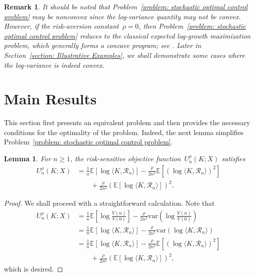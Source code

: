 \documentclass[letterpaper, 10 pt, journal, twoside]{IEEEtran}  %
\newtheorem{lemma}[theorem]{Lemma}
\newtheorem*{remark}{Remark}
\begin{document}
\begin{remark}\rm
    It should be noted that Problem~\eqref{problem: stochastic optimal control problem} may be nonconvex since the log-variance quantity may not be convex. However, if the risk-aversion constant~$\rho =0$, then Problem~\eqref{problem: stochastic optimal control problem} reduces to the classical expected log-growth maximization problem, which generally forms a concave program; see \cite{maclean2011kelly,hsieh2023asymptotic}. Later in Section~\ref{section: Illustrative Examples}, we shall demonstrate some cases where the log-variance is indeed convex.
\end{remark}


\section{Main Results}\label{section: main results}
This section first presents an equivalent problem and then provides the necessary conditions for the optimality of the problem.
 Indeed, the next lemma simplifies Problem~\eqref{problem: stochastic optimal control problem}.

\begin{lemma} \label{lemma: equivalent risk-sensitive problem}
For $n\geq 1$,
    the risk-sensitive objective function~$U_n^\rho(K; X)$   satisfies
    \begin{align*}
	{U_n^\rho}(K; X) 
	&= \frac{1}{n}\mathbb{E}\left[ \log \langle K, \mathcal{R}_n \rangle  \right] - \frac{\rho}{2n^2}\mathbb{E}\left[ \left( \log\langle K, \mathcal{R}_n \rangle  \right)^2 \right] \\
	&\qquad + \frac{\rho}{2n^2}\left( \mathbb{E}\left[ \log\langle K, \mathcal{R}_n \rangle  \right] \right)^2.
\end{align*} 
\end{lemma}

\begin{proof}
We shall proceed with a straightforward calculation.
Note that
    \begin{align*}
	{U_n^\rho}(K; X) 
	&= \frac{1}{n} \mathbb{E}\left[ \log \frac{V(n)}{V(0)} \right] - \frac{\rho}{2n^2}\text{var}\left( \log \frac{V(n)}{V(0)} \right)  \\
	&= \frac{1}{n}\mathbb{E}\left[ \log \langle K, \mathcal{R}_n \rangle \right] - \frac{\rho}{2n^2}\text{var}\left( \log \langle K, \mathcal{R}_n \rangle \right) \\
	&= \frac{1}{n}\mathbb{E}\left[ \log \langle K, \mathcal{R}_n \rangle \right] - \frac{\rho}{2n^2}\mathbb{E}\left[ \left( \log \langle K, \mathcal{R}_n \rangle \right)^2 \right] \\
	&\qquad + \frac{\rho}{2n^2}\left( \mathbb{E}\left[ \log \langle K, \mathcal{R}_n \rangle \right] \right)^2,
\end{align*}
which is desired.
\end{proof}
\end{document}
